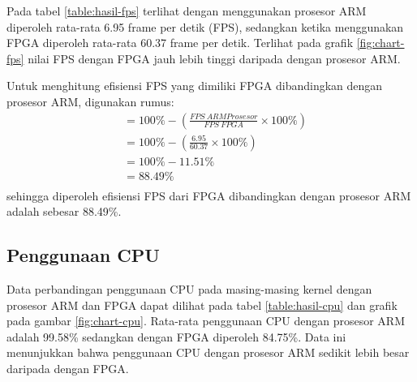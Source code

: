 Pada tabel \ref{table:hasil-fps} terlihat dengan menggunakan prosesor ARM diperoleh rata-rata 6.95 frame per detik (FPS), sedangkan ketika menggunakan FPGA diperoleh rata-rata 60.37 frame per detik. Terlihat pada grafik \ref{fig:chart-fps} nilai FPS dengan FPGA jauh lebih tinggi daripada dengan prosesor ARM.

Untuk menghitung efisiensi FPS yang dimiliki FPGA dibandingkan dengan prosesor ARM, digunakan rumus:
\begin{equation*}
    \begin{split}
& = 100\% - \left( \frac{FPS\ ARM Prosesor}{FPS\ FPGA} \times 100\% \right) \\
& = 100\% - \left( \frac{6.95}{60.37} \times 100\% \right) \\
& = 100\% - 11.51\% \\
& = 88.49\% \\
    \end{split}
\end{equation*}
sehingga diperoleh efisiensi FPS dari FPGA dibandingkan dengan prosesor ARM adalah sebesar 88.49\%.

\subsection{Penggunaan CPU}
Data perbandingan penggunaan CPU pada masing-masing kernel dengan prosesor ARM dan FPGA dapat dilihat pada tabel \ref{table:hasil-cpu} dan grafik pada gambar \ref{fig:chart-cpu}. Rata-rata penggunaan CPU dengan prosesor ARM adalah 99.58\% sedangkan dengan FPGA diperoleh 84.75\%. Data ini menunjukkan bahwa penggunaan CPU dengan prosesor ARM sedikit lebih besar daripada dengan FPGA.

